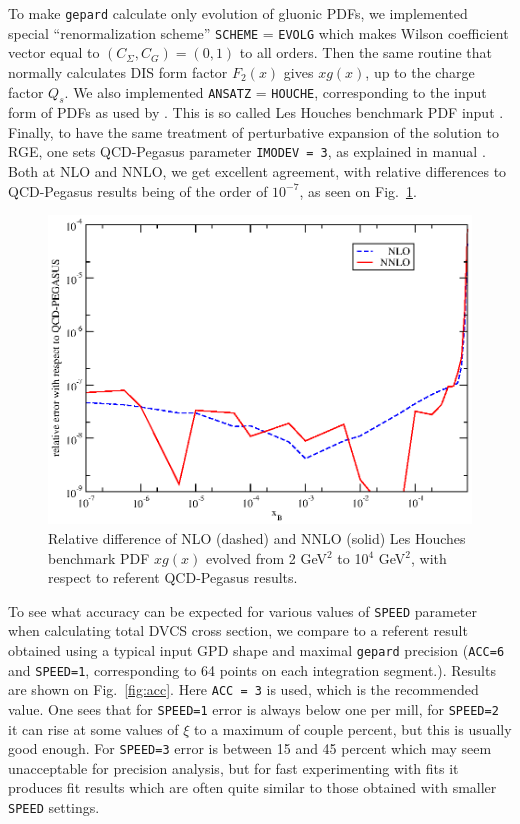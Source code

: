 \documentclass[12pt]{article}
\begin{document}
To make \texttt{gepard} calculate only evolution of gluonic PDFs, we implemented special
``renormalization scheme'' \texttt{SCHEME} = \texttt{EVOLG} which
makes Wilson coefficient vector equal to $(C_{\Sigma}, C_G) = (0, 1)$
to all orders. Then the same routine that normally calculates DIS form factor
$F_2(x)$ gives $x g(x)$, up
to the charge factor $Q_s$. We also implemented \texttt{ANSATZ} = \texttt{HOUCHE}, corresponding to the
input form of PDFs as used by \cite{Vogt:2004ns}. This is so called Les Houches benchmark PDF
input \cite{Giele:2002hx}.  Finally, to have the same treatment of perturbative expansion of
the solution to RGE, one sets {\sc QCD-Pegasus} parameter \texttt{IMODEV = 3}, as explained in
manual \cite{Vogt:2004ns}. 
Both at NLO and NNLO, we get excellent agreement, with relative differences to
{\sc QCD-Pegasus} results being of the order of $10^{-7}$, as seen on
Fig.~\ref{fig:PDFevol}.


\begin{figure}
\begin{center}
\includegraphics[scale=0.8]{PDFevol}
\end{center}
\caption{Relative difference of NLO (dashed) and NNLO (solid) Les Houches benchmark PDF $x g(x)$
evolved from 2 GeV$^2$ to 10$^4$ GeV$^2$, with respect to referent {\sc QCD-Pegasus} 
\cite{Vogt:2004ns} results.}
\label{fig:PDFevol}
\end{figure}

To see what accuracy can be expected for various values of \texttt{SPEED} parameter 
when calculating total
DVCS cross section, we compare to a referent result obtained using a typical input GPD shape and
maximal \texttt{gepard} precision (\texttt{ACC=6} and \texttt{SPEED=1}, corresponding to
64 points on each integration segment.). Results are shown on
Fig.~\ref{fig:acc}. Here \texttt{ACC = 3} is used, which is the recommended value.
One sees that for  \texttt{SPEED=1} error is always below one per mill, for
\texttt{SPEED=2} it can rise at some values of $\xi$ to a maximum of couple percent, 
but this is usually good
enough. For \texttt{SPEED=3} error is between 15 and 45 percent which may seem
unacceptable for precision analysis, but for fast experimenting with fits it
produces fit results which are often quite similar to those obtained with
smaller \texttt{SPEED} settings.
\end{document}
